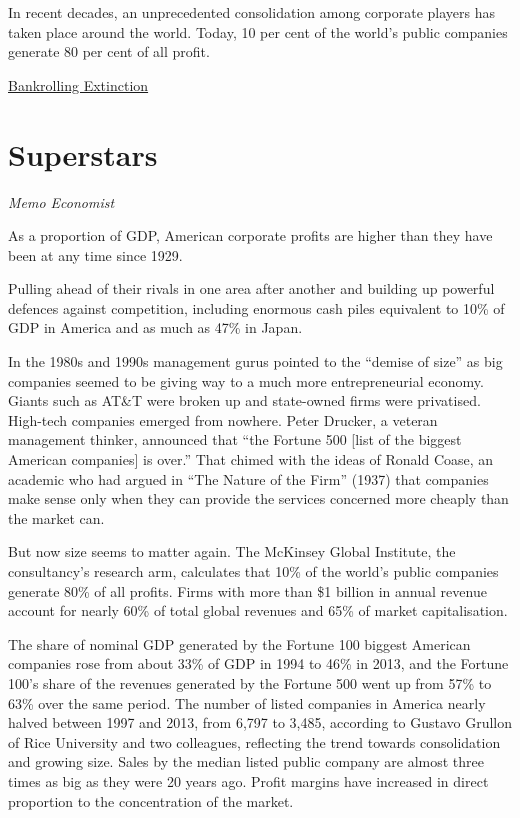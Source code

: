 \documentclass[
]{book}
\begin{document}
In recent decades, an unprecedented
consolidation among corporate players has
taken place around the world. Today, 10 per
cent of the world's public companies generate
80 per cent of all profit.

\href{https://portfolio.earth/campaigns/bankrolling-extinction/}{Bankrolling Extinction}

\hypertarget{superstars}{%
\section{Superstars}\label{superstars}}

\emph{Memo Economist}

As a proportion of GDP, American corporate profits are higher
than they have been at any time since 1929.

Pulling ahead of their rivals in one area after another and building up powerful defences against competition, including enormous cash piles equivalent to 10\% of GDP in America and as much as 47\% in Japan.

In the 1980s and 1990s management gurus pointed to the ``demise of size'' as big companies seemed to be giving way to a much more entrepreneurial economy.
Giants such as AT\&T were broken up and state-owned firms were privatised. High-tech companies emerged from nowhere. Peter Drucker, a veteran management thinker, announced that ``the Fortune 500 {[}list of the biggest American companies{]} is over.'' That chimed with the ideas of Ronald Coase, an academic who had argued in ``The Nature of the Firm'' (1937) that companies make sense only when they can provide the services concerned more cheaply than the market can.

But now size seems to matter again. The McKinsey Global Institute, the consultancy's research arm, calculates that 10\% of the world's public companies generate 80\% of all profits.
Firms with more than \$1 billion in annual revenue account for nearly 60\% of total global revenues and 65\% of market capitalisation.

The share of nominal GDP generated by the Fortune 100 biggest American companies rose from about 33\% of GDP in 1994 to 46\% in 2013, and the Fortune 100's share of the revenues generated by the Fortune 500 went up from 57\% to 63\% over the same period. The number of listed companies in America nearly halved between 1997 and 2013, from 6,797 to 3,485, according to Gustavo Grullon of Rice University and two colleagues, reflecting the trend towards consolidation and growing size. Sales by the median listed public company are almost three times as big as they were 20 years ago. Profit margins have increased in direct proportion to the concentration of the market.
\end{document}
